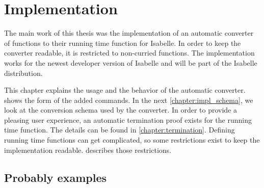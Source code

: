 
\chapter{Implementation}\label{chapter:impl}

The main work of this thesis was the implementation of an automatic converter of functions to their running time function for Isabelle.
In order to keep the converter readable, it is restricted to non-curried functions.
The implementation works for the newest developer version of Isabelle and will be part of the Isabelle distribution.

This chapter explains the usage and the behavior of the automatic converter.
 shows the form of the added commands.
In the next \autoref{chapter:impl_schema}, we look at the conversion schema used by the converter.
In order to provide a pleasing user experience, an automatic termination proof exists for the running time function.
The details can be found in \autoref{chapter:termination}.
Defining running time functions can get complicated, so some restrictions exist to keep the implementation readable.
 describes those restrictions.






\section{Probably examples}
